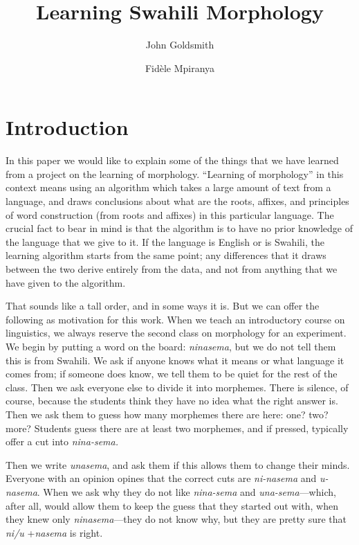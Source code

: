 \documentclass[output=paper,colorlinks,citecolor=brown,
]{langscibook}
\author{John Goldsmith\affiliation{University of Chicago}\and Fidèle Mpiranya\affiliation{University of Chicago}}
\title{Learning Swahili Morphology}
\begin{document}
\maketitle

\section{Introduction}
In this paper we would like to explain some of the things that we have learned from a project on the learning of morphology. ``Learning of morphology'' in this context means using an algorithm which takes a large amount of text from a language, and draws conclusions about what are the roots, affixes, and principles of word construction (from roots and affixes) in this particular language. The crucial fact to bear in mind is that the algorithm is to have no prior knowledge of the language that we give to it. If the language is English or is Swahili, the learning algorithm starts from the same point; any differences that it draws between the two derive entirely from the data, and not from anything that we have given to the algorithm. 

That sounds like a tall order, and in some ways it is. But we can offer the following as motivation for this work. When we teach an introductory course on linguistics, we always reserve the second class on morphology for an experiment. We begin by putting a word on the board: \textit{ninasema}, but we do not tell them this is from Swahili. We ask if anyone knows what it means or what language it comes from; if someone does know, we tell them to be quiet for the rest of the class. Then we ask everyone else to divide it into morphemes. There is silence, of course, because the students think they have no idea what the right answer is. Then we ask them to guess how many morphemes there are here: one? two? more? Students guess there are at least two morphemes, and if pressed, typically offer a cut into \textit{nina-sema.}

Then we write \textit{unasema}, and ask them if this allows them to change their minds. Everyone with an opinion opines that the correct cuts are \textit{ni-nasema} and \textit{u-nasema}. When we ask why they do not like \textit{nina-sema} and \textit{una-sema}---which, after all, would allow them to keep the guess that they started out with, when they knew only \textit{ninasema}---they do not know why, but they are pretty sure that \textit{ni/u} +\textit{nasema} is right.
\end{document}
